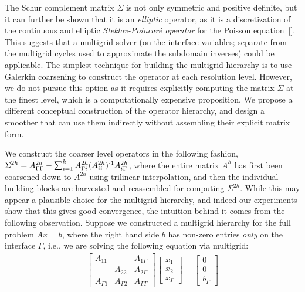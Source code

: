 The Schur complement matrix $\Sigma$ is not only symmetric and positive definite, but it can further be shown that it is an \emph{elliptic} operator, as it is a
discretization of the continuous and elliptic \emph{Steklov-Poincar\'{e} operator} for the Poisson equation~[\cite{Smith:1996:DDP:238150}]. This suggests that a
multigrid solver (on the interface variables; separate from the multigrid cycles used to approximate the subdomain inverses) could be applicable.
 The simplest technique for building the multigrid
hierarchy is to use Galerkin coarsening to construct the operator at each
resolution level. However, we do not pursue this option as it requires explicitly computing
the matrix $\Sigma$ at the finest level, which is a computationally expensive proposition. We propose a different conceptual construction of the operator hierarchy,
and design a smoother that can use them indirectly without assembling their explicit matrix form.


We construct the coarser level operators in the following fashion,
$\Sigma^{2h}=A_{\Gamma\Gamma}^{2h}-\sum_{i=1}^kA_{\Gamma
i}^{2h}(A_{ii}^{2h})^{\operatorname{-1}}A_{i \Gamma}^{2h}$, where the entire matrix
$A^{h}$ has first been coarsened down to $A^{2h}$ using trilinear interpolation, and
then the individual building blocks are harvested and reassembled for computing
$\Sigma^{2h}$.  While this may appear a plausible choice for the multigrid
hierarchy, and indeed our experiments show that this gives good convergence, the
intuition behind it comes from the following
observation. Suppose we constructed a multigrid hierarchy for the full problem $Ax=b$,
where the right hand side $b$ has non-zero entries \emph{only} on
the interface $\Gamma$, i.e., we are solving the following equation via
multigrid:
\begin{eqnarray}
\label{eqn:sigma-multigrid-intuition}
\begin{bmatrix}
A_{11} & & A_{1\Gamma} \\
& A_{22} & A_{2\Gamma} \\
A_{\Gamma 1} & A_{\Gamma 2} & A_{\Gamma\Gamma}
\end{bmatrix}
\begin{bmatrix}
x_1 \\
x_2 \\
x_\Gamma
\end{bmatrix}
=
\begin{bmatrix}
0 \\
0 \\
b_\Gamma
\end{bmatrix}
\end{eqnarray}

